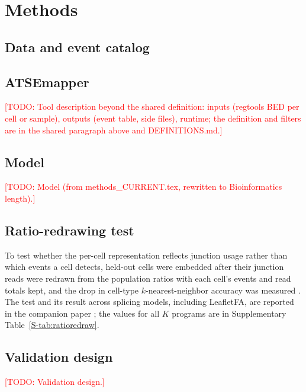 \documentclass[webpdf,traditional,large,namedate]{oup-authoring-template}
\let\cite\citep
\newcommand{\todo}[1]{\textcolor{red}{[TODO: #1]}}
\begin{document}
\section{Methods}
\subsection{Data and event catalog}


\subsection{ATSEmapper}
\todo{Tool description beyond the shared definition: inputs (regtools BED per cell or sample), outputs (event table, side files),
runtime; the definition and filters are in the shared paragraph above and DEFINITIONS.md.}

\subsection{Model}\label{sec:model}
\todo{Model (from methods\_CURRENT.tex, rewritten to Bioinformatics length).}

\subsection{Ratio-redrawing test}
To test whether the per-cell representation reflects junction usage rather than which events a cell detects, held-out
cells were embedded after their junction reads were redrawn from the population ratios with each cell's events and read
totals kept, and the drop in cell-type $k$-nearest-neighbor accuracy was measured \cite{SpliceVI2026}. The test and its
result across splicing models, including LeafletFA, are reported in the companion paper \cite{SpliceVI2026}; the values
for all $K$ programs are in Supplementary Table~\ref{S-tab:ratioredraw}.

\subsection{Validation design}
\todo{Validation design.}
\end{document}
